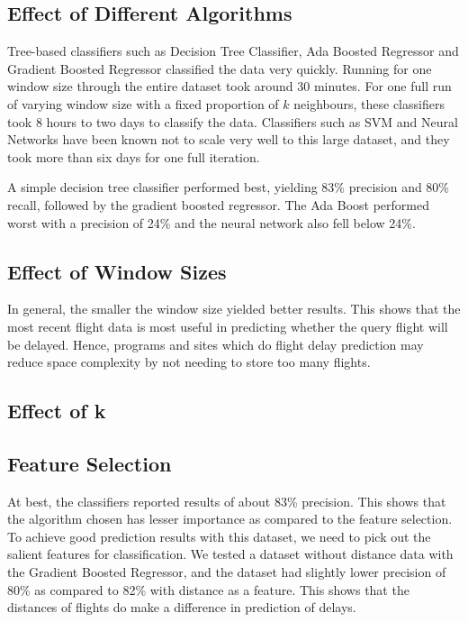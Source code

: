 \documentclass[letterpaper,11pt]{article}
\begin{document}
\subsection{Effect of Different Algorithms}
Tree-based classifiers such as Decision Tree Classifier, Ada Boosted Regressor and Gradient Boosted Regressor classified the data very quickly. Running for one window size through the entire dataset took around 30 minutes. For one full run of varying window size with a fixed proportion of $k$ neighbours, these classifiers took 8 hours to two days to classify the data. Classifiers such as SVM and Neural Networks have been known not to scale very well to this large dataset, and they took more than six days for one full iteration. 

A simple decision tree classifier performed best, yielding 83\% precision and 80\% recall, followed by the gradient boosted regressor. The Ada Boost performed worst with a precision of 24\% and the neural network also fell below 24\%. 

\subsection{Effect of Window Sizes}
In general, the smaller the window size yielded better results. This shows that the most recent flight data is most useful in predicting whether the query flight will be delayed. Hence, programs and sites which do flight delay prediction may reduce space complexity by not needing to store too many flights. 

\subsection{Effect of k}

\subsection{Feature Selection} 
At best, the classifiers reported results of about 83\% precision. This shows that the algorithm chosen has lesser importance as compared to the feature selection. To achieve good prediction results with this dataset, we need to pick out the salient features for classification. We tested a dataset without distance data with the Gradient Boosted Regressor, and the dataset had slightly lower precision of 80\% as compared to 82\% with distance as a feature. This shows that the distances of flights do make a difference in prediction of delays. 
\end{document}
